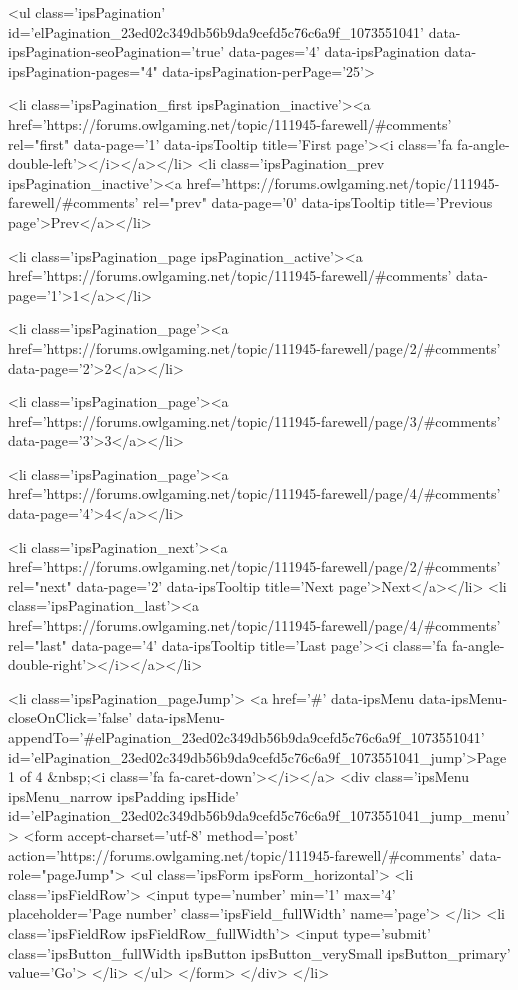 	
	<ul class='ipsPagination' id='elPagination_23ed02c349db56b9da9cefd5c76c6a9f_1073551041' data-ipsPagination-seoPagination='true' data-pages='4' data-ipsPagination  data-ipsPagination-pages="4" data-ipsPagination-perPage='25'>
		
			
				<li class='ipsPagination_first ipsPagination_inactive'><a href='https://forums.owlgaming.net/topic/111945-farewell/#comments' rel="first" data-page='1' data-ipsTooltip title='First page'><i class='fa fa-angle-double-left'></i></a></li>
				<li class='ipsPagination_prev ipsPagination_inactive'><a href='https://forums.owlgaming.net/topic/111945-farewell/#comments' rel="prev" data-page='0' data-ipsTooltip title='Previous page'>Prev</a></li>
			
			<li class='ipsPagination_page ipsPagination_active'><a href='https://forums.owlgaming.net/topic/111945-farewell/#comments' data-page='1'>1</a></li>
			
				
					<li class='ipsPagination_page'><a href='https://forums.owlgaming.net/topic/111945-farewell/page/2/#comments' data-page='2'>2</a></li>
				
					<li class='ipsPagination_page'><a href='https://forums.owlgaming.net/topic/111945-farewell/page/3/#comments' data-page='3'>3</a></li>
				
					<li class='ipsPagination_page'><a href='https://forums.owlgaming.net/topic/111945-farewell/page/4/#comments' data-page='4'>4</a></li>
				
				<li class='ipsPagination_next'><a href='https://forums.owlgaming.net/topic/111945-farewell/page/2/#comments' rel="next" data-page='2' data-ipsTooltip title='Next page'>Next</a></li>
				<li class='ipsPagination_last'><a href='https://forums.owlgaming.net/topic/111945-farewell/page/4/#comments' rel="last" data-page='4' data-ipsTooltip title='Last page'><i class='fa fa-angle-double-right'></i></a></li>
			
			
				<li class='ipsPagination_pageJump'>
					<a href='#' data-ipsMenu data-ipsMenu-closeOnClick='false' data-ipsMenu-appendTo='#elPagination_23ed02c349db56b9da9cefd5c76c6a9f_1073551041' id='elPagination_23ed02c349db56b9da9cefd5c76c6a9f_1073551041_jump'>Page 1 of 4 &nbsp;<i class='fa fa-caret-down'></i></a>
					<div class='ipsMenu ipsMenu_narrow ipsPadding ipsHide' id='elPagination_23ed02c349db56b9da9cefd5c76c6a9f_1073551041_jump_menu'>
						<form accept-charset='utf-8' method='post' action='https://forums.owlgaming.net/topic/111945-farewell/#comments' data-role="pageJump">
							<ul class='ipsForm ipsForm_horizontal'>
								<li class='ipsFieldRow'>
									<input type='number' min='1' max='4' placeholder='Page number' class='ipsField_fullWidth' name='page'>
								</li>
								<li class='ipsFieldRow ipsFieldRow_fullWidth'>
									<input type='submit' class='ipsButton_fullWidth ipsButton ipsButton_verySmall ipsButton_primary' value='Go'>
								</li>
							</ul>
						</form>
					</div>
				</li>
			
